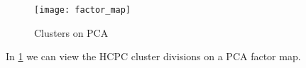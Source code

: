 \begin{figure}[H]
\centering
\texttt{[image: factor\_map]}
\caption{Clusters on PCA}%
\label{fig:clusters-pca}
\end{figure}

In \cref{fig:clusters-pca} we can view the HCPC cluster divisions on a PCA factor map.

